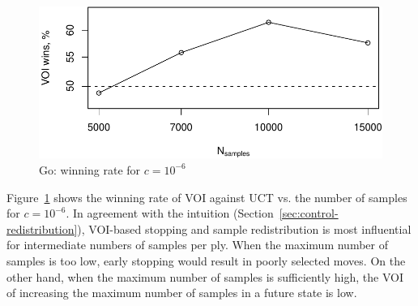\documentclass[]{article}
\begin{document}
\begin{figure}[h!]
\centering
\includegraphics[scale=0.6]{voi-wins.pdf}
\caption{Go: winning rate for $c=10^{-6}$}
\label{fig:voi-wins}
\end{figure}

Figure~\ref{fig:voi-wins}
shows the winning rate of VOI against UCT vs. the number of
samples for $c=10^{-6}$. In agreement with the intuition
(Section~\ref{sec:control-redistribution}), VOI-based stopping and
sample redistribution is most influential for intermediate numbers of
samples per ply. When the maximum number of samples is too low, early
stopping would result in poorly selected moves. On the other hand,
when the maximum number of samples is sufficiently high, the VOI of
increasing the maximum number of samples in a future state is low.



\end{document}
